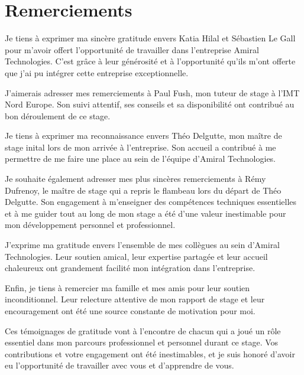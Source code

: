 \section*{Remerciements}
Je tiens à exprimer ma sincère gratitude envers Katia Hilal et Sébastien Le Gall pour m'avoir offert l'opportunité de travailler dans l'entreprise Amiral Technologies.
C'est grâce à leur générosité et à l'opportunité qu'ils m'ont offerte que j'ai pu intégrer cette entreprise exceptionnelle.

J'aimerais adresser mes remerciements à Paul Fush, mon tuteur de stage à l'IMT Nord Europe.
Son suivi attentif, ses conseils et sa disponibilité ont contribué au bon déroulement de ce stage.

Je tiens à exprimer ma reconnaissance envers Théo Delgutte, mon maître de stage inital lors de mon arrivée à l'entreprise.
Son accueil a contribué à me permettre de me faire une place au sein de l'équipe d'Amiral Technologies.

Je souhaite également adresser mes plus sincères remerciements à Rémy Dufrenoy, le maître de stage qui a repris le flambeau lors du départ de Théo Delgutte.
Son engagement à m'enseigner des compétences techniques essentielles et à me guider tout au long de mon stage a été d'une valeur inestimable pour mon développement personnel et professionnel.

J'exprime ma gratitude envers l'ensemble de mes collègues au sein d'Amiral Technologies.
Leur soutien amical, leur expertise partagée et leur accueil chaleureux ont grandement facilité mon intégration dans l'entreprise.

Enfin, je tiens à remercier ma famille et mes amis pour leur soutien inconditionnel.
Leur relecture attentive de mon rapport de stage et leur encouragement ont été une source constante de motivation pour moi.

Ces témoignages de gratitude vont à l'encontre de chacun qui a joué un rôle essentiel dans mon parcours professionnel et personnel durant ce stage.
Vos contributions et votre engagement ont été inestimables, et je suis honoré d'avoir eu l'opportunité de travailler avec vous et d'apprendre de vous.